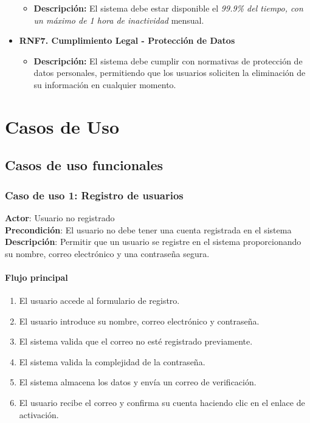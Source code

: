 \documentclass{scrreprt}
\begin{document}
\begin{itemize}
    \begin{itemize}
        \item \textbf{Descripción:} El sistema debe estar disponible el \textit{99.9\% del tiempo, con un máximo de 1 hora de inactividad} mensual.
    \end{itemize}
    \item \textbf{RNF7. Cumplimiento Legal - Protección de Datos}
    \begin{itemize}
        \item \textbf{Descripción:} El sistema debe cumplir con normativas de protección de datos personales, permitiendo que los usuarios soliciten la eliminación de su información en cualquier momento.
    \end{itemize}
\end{itemize}

\chapter{Casos de Uso}
\section{Casos de uso funcionales}

\subsection{Caso de uso 1: Registro de usuarios}
\textbf{Actor}: Usuario no registrado \\
\textbf{Precondición}: El usuario no debe tener una cuenta registrada en el sistema \\
\textbf{Descripción}: Permitir que un usuario se registre en el sistema proporcionando su nombre, correo electrónico y una contraseña segura.

\subsubsection{Flujo principal}
\begin{enumerate}
    \item El usuario accede al formulario de registro.
    \item El usuario introduce su nombre, correo electrónico y contraseña.
    \item El sistema valida que el correo no esté registrado previamente.
    \item El sistema valida la complejidad de la contraseña.
    \item El sistema almacena los datos y envía un correo de verificación.
    \item El usuario recibe el correo y confirma su cuenta haciendo clic en el enlace de activación.
\end{enumerate}
\end{document}
